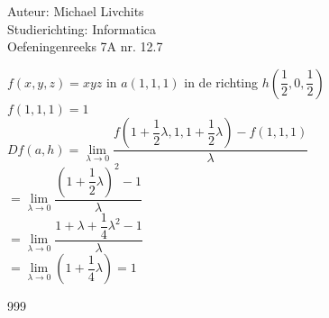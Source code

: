 \documentclass[a4paper]{article}
\begin{document}
  
\noindent \large Auteur: Michael Livchits \\
\noindent \large Studierichting: Informatica\\
\noindent \large Oefeningenreeks 7A nr. 12.7\\

\medskip

\normalsize

$f(x,y,z) = xyz$ in $a\left(1,1,1\right)$ in de richting $h\left(\dfrac{1}{2},0,\dfrac{1}{2}\right)$\\

$f\left(1,1,1\right) = 1$\\

$Df(a,h) = \lim\limits_{\lambda\rightarrow 0}\dfrac{f\left(1+\dfrac{1}{2}\lambda,1,1+\dfrac{1}{2}\lambda\right) - f\left(1,1,1\right)}{\lambda}$\\

$= \lim\limits_{\lambda\rightarrow 0}\dfrac{\left(1+\dfrac{1}{2}\lambda\right)^2 - 1}{\lambda}$\\

$= \lim\limits_{\lambda\rightarrow 0}\dfrac{1+\lambda+\dfrac{1}{4}\lambda^2 - 1}{\lambda}$\\

$= \lim\limits_{\lambda\rightarrow 0}\left(1+\dfrac{1}{4}\lambda\right) = 1$\\

\begin{thebibliography}{999}
\end{thebibliography}
\end{document}
